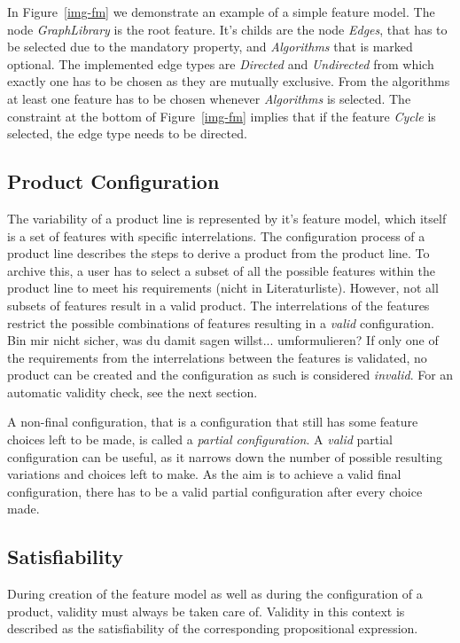 In Figure~\ref{img-fm} we demonstrate an example of a simple feature model. The node \textit{GraphLibrary} is the root feature. It's childs are the node \textit{Edges}, that has to be selected due to the mandatory property, and \textit{Algorithms} that is marked optional. The implemented edge types are \textit{Directed} and \textit{Undirected} from which exactly one has to be chosen as they are mutually exclusive. From the algorithms at least one feature has to be chosen whenever \textit{Algorithms} is selected. The constraint at the bottom of Figure~\ref{img-fm} implies that if the feature \textit{Cycle} is selected, the edge type needs to be directed.


\subsection{Product Configuration}
The variability of a product line is represented by it's feature model, which itself is a set of features with specific interrelations. The configuration process of a product line describes the steps to derive a product from the product line. To archive this, a user has to select a subset of all the possible features within the product line to meet his requirements \cite{vrt}{\color{red} (nicht in Literaturliste)}. However, not all subsets of features result in a valid product. The interrelations of the features restrict the possible combinations of features resulting in a \textit{valid} configuration. {\color{red} Bin mir nicht sicher, was du damit sagen willst... umformulieren?} If only one of the requirements from the interrelations between the features is validated, no product can be created and the configuration as such is considered \textit{invalid}. For an automatic validity check, see the next section.

A non-final configuration, that is a configuration that still has some feature choices left to be made, is called a \textit{partial configuration}. A \textit{valid} partial configuration can be useful, as it narrows down the number of possible resulting variations and choices left to make. As the aim is to achieve a valid final configuration, there has to be a valid partial configuration after every choice made.


\subsection{Satisfiability} \label{ch:sat}
During creation of the feature model as well as during the configuration of a product, validity must always be taken care of. Validity in this context is described as the satisfiability of the corresponding propositional expression.

